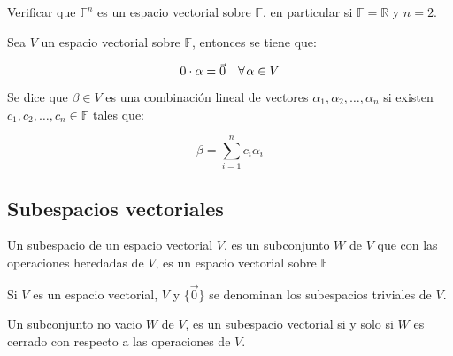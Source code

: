 		\begin{ejemplo}
		\end{ejemplo}

		\begin{ejercicio}
			Verificar que $\mathbb{F}^n$ es un espacio vectorial sobre $\mathbb{F}$, en particular si $\mathbb{F} = \mathbb{R}$ y $n = 2$.
		\end{ejercicio}

		\begin{proposicion}
			Sea $V$ un espacio vectorial sobre $\mathbb{F}$, entonces se tiene que:

			\begin{equation}
				0 \cdot \alpha = \vec{0} \quad \forall \mkern2mu \alpha \in V
			\end{equation}
		\end{proposicion}

		\begin{definicion}
			Se dice que $\beta \in V$ es una combinación lineal de vectores $\alpha_1, \alpha_2, \dots, \alpha_n$ si existen $c_1, c_2, \dots, c_n \in \mathbb{F}$ tales que:

			\begin{equation}
				\beta = \sum_{i=1}^n c_i \alpha_i
			\end{equation}
		\end{definicion}


	\subsection{Subespacios vectoriales}

		\begin{definicion}
			Un subespacio de un espacio vectorial $V$, es un subconjunto $W$ de $V$ que con las operaciones heredadas de $V$, es un espacio vectorial sobre $\mathbb{F}$ 
		\end{definicion}

		\begin{observacion}
			Si $V$ es un espacio vectorial, $V$ y $\{\vec{0}\}$ se denominan los subespacios triviales de $V$.
		\end{observacion}

		\begin{proposicion}
			Un subconjunto no vacio $W$ de $V$, es un subespacio vectorial si y solo si $W$ es cerrado con respecto a las operaciones de $V$.
		\end{proposicion}


